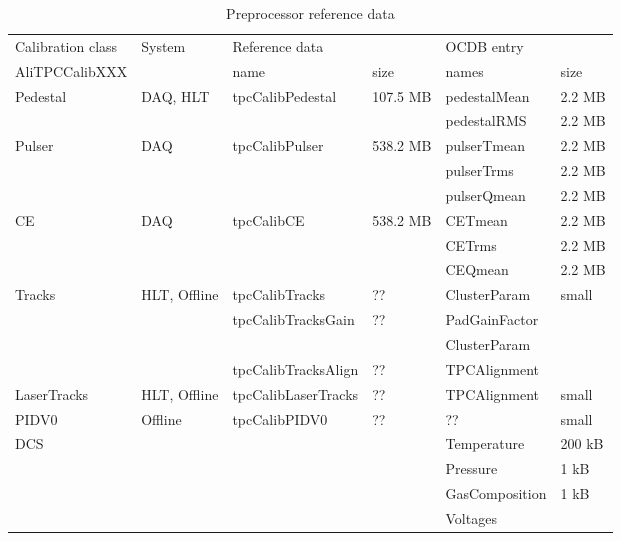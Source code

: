 \documentclass[a4paper,12pt]{article}
\begin{document}
\begin{table}
 \caption{Preprocessor reference data}
 \begin{sideways}
 \label{preproctable} 
 \begin{tabular}{|l|l|l|l|l|l|} \hline
  Calibration class & System & \multicolumn{2}{|l|}{Reference data} &
  \multicolumn{2}{|l|}{OCDB entry} \\ \cline{3-6}
  AliTPCCalibXXX & & name & size & names & size  \\ \hline 
  Pedestal & DAQ, HLT & tpcCalibPedestal & 107.5 MB & pedestalMean & 2.2 MB \\
           &          &                  &          & pedestalRMS & 2.2 MB 
  \\ \hline 
  Pulser  &  DAQ   & tpcCalibPulser      & 538.2 MB & pulserTmean & 2.2 MB \\
          &        &                     &          & pulserTrms  & 2.2 MB \\
	  &        &                     &          & pulserQmean & 2.2 MB
  \\ \hline 
  CE      &  DAQ   & tpcCalibCE          & 538.2 MB & CETmean     & 2.2 MB \\
          &        &                     &          & CETrms      & 2.2 MB \\
	  &        &                     &          & CEQmean     & 2.2 MB
  \\ \hline 
  Tracks  & HLT, Offline & tpcCalibTracks & ??      & ClusterParam & small \\
          &              & tpcCalibTracksGain & ??  & PadGainFactor &      \\
	  &              &                    &     & ClusterParam  &      \\
	  &              & tpcCalibTracksAlign & ?? & TPCAlignment  &    \\
	  \hline
  LaserTracks & HLT, Offline & tpcCalibLaserTracks & ?? & TPCAlignment & small
  \\ \hline 
  PIDV0   & Offline & tpcCalibPIDV0      & ??       & ??           & small
  \\ \hline 
  DCS     &         &                &        & Temperature & 200 kB \\
          &         &                &        & Pressure    & 1 kB \\
	  &         &                &        & GasComposition & 1 kB \\
	  &         &                &        & Voltages    &       \\ \hline
  \end{tabular}
 \end{sideways}
\end{table}
\end{document}
